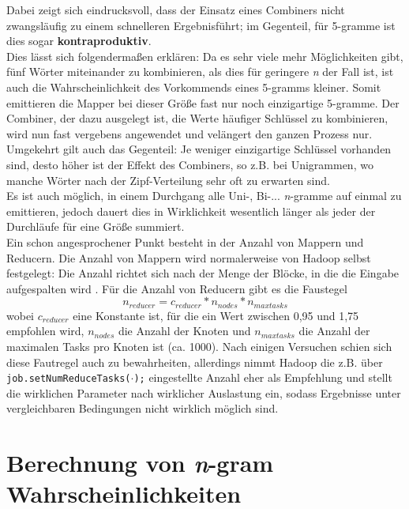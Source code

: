 \documentclass[a4paper,12pt]{scrartcl}
\begin{document}
    Dabei zeigt sich eindrucksvoll, dass der Einsatz eines Combiners nicht zwangsläufig zu einem schnelleren Ergebnisführt; im Gegenteil, für 5-gramme ist dies sogar \textbf{kontraproduktiv}.\\

    Dies lässt sich folgendermaßen erklären: Da es sehr viele mehr Möglichkeiten gibt, fünf Wörter miteinander zu kombinieren, als dies für geringere \emph{n} der Fall ist, ist auch die Wahrscheinlichkeit des Vorkommends eines 5-gramms kleiner. Somit emittieren die Mapper bei dieser Größe fast nur noch einzigartige 5-gramme. Der Combiner, der dazu ausgelegt ist, die Werte häufiger Schlüssel zu kombinieren, wird nun fast vergebens angewendet und velängert den ganzen Prozess nur. \\

    Umgekehrt gilt auch das Gegenteil: Je weniger einzigartige Schlüssel vorhanden sind, desto höher ist der Effekt des Combiners, so z.B. bei Unigrammen, wo manche Wörter nach der Zipf-Verteilung sehr oft zu erwarten sind. \\
    Es ist auch möglich, in einem Durchgang alle Uni-, Bi-... \emph{n}-gramme auf einmal zu emittieren, jedoch dauert dies in Wirklichkeit wesentlich länger als jeder der Durchläufe für eine Größe summiert. \\

    Ein schon angesprochener Punkt besteht in der Anzahl von Mappern und Reducern. Die Anzahl von Mappern wird normalerweise von Hadoop selbst festgelegt: Die Anzahl richtet sich nach der Menge der Blöcke, in die die Eingabe aufgespalten wird \cite{hadoop}. Für die Anzahl von Reducern gibt es die Faustegel
    \[n_{reducer} = c_{reducer} * n_{nodes} * n_{max tasks}\]
    wobei $c_{reducer}$ eine Konstante ist, für die ein Wert zwischen 0,95 und 1,75 empfohlen wird, $n_{nodes}$ die Anzahl der Knoten und $n_{max tasks}$ die Anzahl der maximalen Tasks pro Knoten ist (ca. 1000). Nach einigen Versuchen schien sich diese Fautregel auch zu bewahrheiten, allerdings nimmt Hadoop die z.B. über {\tt job.setNumReduceTasks($\cdot$);} eingestellte Anzahl eher als Empfehlung und stellt die wirklichen Parameter nach wirklicher Auslastung ein, sodass Ergebnisse unter vergleichbaren Bedingungen nicht wirklich möglich sind.

\section{Berechnung von \emph{n}-gram Wahrscheinlichkeiten}
\end{document}
